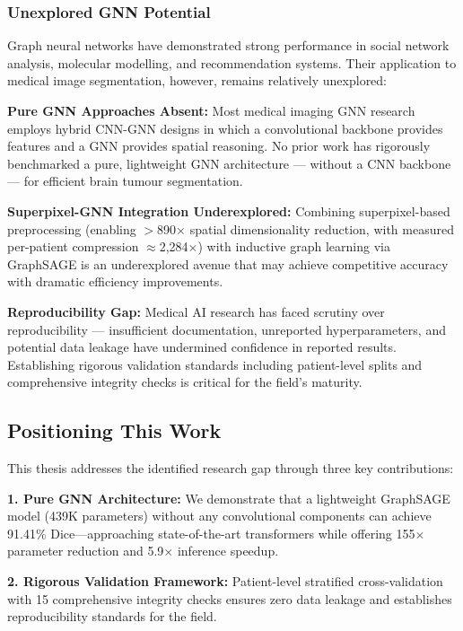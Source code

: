 \documentclass{article}
\begin{document}
\subsubsection{Unexplored GNN Potential}

Graph neural networks have demonstrated strong performance in social network analysis, molecular modelling, and recommendation systems. Their application to medical image segmentation, however, remains relatively unexplored:

\textbf{Pure GNN Approaches Absent:} Most medical imaging GNN research employs hybrid CNN-GNN designs in which a convolutional backbone provides features and a GNN provides spatial reasoning. No prior work has rigorously benchmarked a pure, lightweight GNN architecture — without a CNN backbone — for efficient brain tumour segmentation.

\textbf{Superpixel-GNN Integration Underexplored:} Combining superpixel-based preprocessing (enabling $>$890$\times$ spatial dimensionality reduction, with measured per-patient compression $\approx$2,284$\times$) with inductive graph learning via GraphSAGE is an underexplored avenue that may achieve competitive accuracy with dramatic efficiency improvements.

\textbf{Reproducibility Gap:} Medical AI research has faced scrutiny over reproducibility — insufficient documentation, unreported hyperparameters, and potential data leakage have undermined confidence in reported results. Establishing rigorous validation standards including patient-level splits and comprehensive integrity checks is critical for the field's maturity.

\subsection{Positioning This Work}

This thesis addresses the identified research gap through three key contributions:

\textbf{1. Pure GNN Architecture:} We demonstrate that a lightweight GraphSAGE model (439K parameters) without any convolutional components can achieve 91.41\% Dice—approaching state-of-the-art transformers while offering 155$\times$ parameter reduction and 5.9$\times$ inference speedup.

\textbf{2. Rigorous Validation Framework:} Patient-level stratified cross-validation with 15 comprehensive integrity checks ensures zero data leakage and establishes reproducibility standards for the field.
\end{document}

